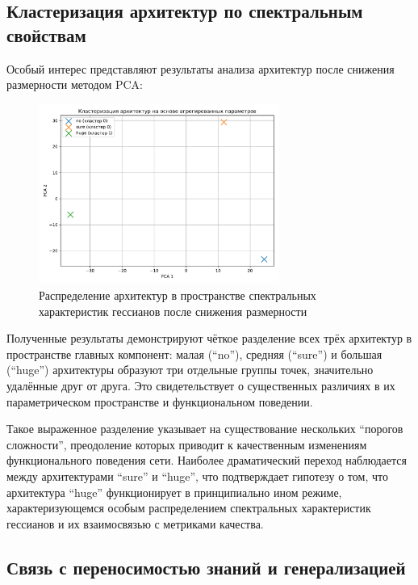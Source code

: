 \documentclass[a4paper,12pt]{article}
\begin{document}
\newpage

\subsection{Кластеризация архитектур по спектральным свойствам}

Особый интерес представляют результаты анализа архитектур после снижения размерности методом PCA:

\begin{figure}[ht]
  \centering
  \includegraphics[width=0.7\textwidth]{architecture_clustering.pdf}
  \caption{Распределение архитектур в пространстве спектральных характеристик гессианов после снижения размерности}
  \label{fig:architecture_clustering}
\end{figure}

Полученные результаты демонстрируют чёткое разделение всех трёх архитектур в пространстве главных компонент:
малая (``no''), средняя (``sure'') и большая (``huge'') архитектуры образуют три отдельные группы точек,
значительно удалённые друг от друга. Это свидетельствует о существенных различиях в их параметрическом
пространстве и функциональном поведении.

Такое выраженное разделение указывает на существование нескольких ``порогов сложности'', преодоление которых
приводит к качественным изменениям функционального поведения сети. Наиболее драматический переход наблюдается
между архитектурами ``sure'' и ``huge'', что подтверждает гипотезу о том, что архитектура ``huge''
функционирует в принципиально ином режиме, характеризующемся особым распределением спектральных характеристик
гессианов и их взаимосвязью с метриками качества.

\subsection{Связь с переносимостью знаний и генерализацией}
\end{document}
